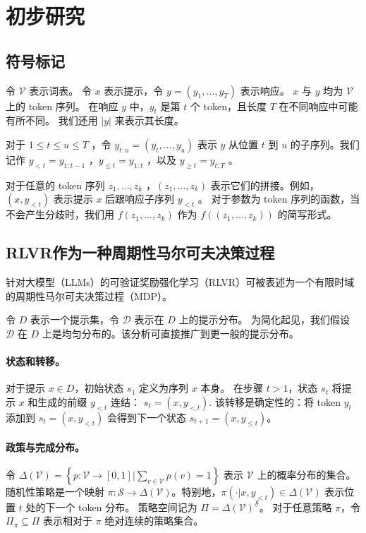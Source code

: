 \documentclass[11pt]{article}
\theoremstyle{definition}
\def\dr#1{\left\{#1\right\}}
\def\calD{\mathcal{D}}
\def\calS{\mathcal{S}}
\newcommand\tpi{\pi}
\newcommand\policyspace{\Pi}
\begin{document}
\FloatBarrier

\section{初步研究}\label{sec:prel1}

\subsection{符号标记}\label{sec:prel2}  
令 $\mathcal{V}$ 表示词表。  
令 $x$ 表示提示，令 $y=(y_1,\ldots,y_T)$ 表示响应。  
$x$ 与 $y$ 均为 $\mathcal{V}$ 上的 token 序列。  
在响应 $y$ 中，$y_t$ 是第 $t$ 个 token，且长度 $T$ 在不同响应中可能有所不同。  
我们还用 $|y|$ 来表示其长度。

对于 $1\leq t\leq u\leq T$ ，令 $y_{t:u}=(y_t,\ldots,y_u)$ 表示 $y$ 从位置 $t$ 到 $u$ 的子序列。我们记作 $y_{<t} = y_{1:t-1}$ ，$y_{\leq t} = y_{1:t}$ ，以及 $y_{\geq t} = y_{t:T}$ 。   

对于任意的 token 序列 $z_1,\ldots,z_k$ ，$(z_1,\ldots,z_k)$ 表示它们的拼接。例如，$(x,y_{<t})$ 表示提示 $x$ 后跟响应子序列 $y_{<t}$ 。 
对于参数为 token 序列的函数，当不会产生分歧时，我们用 $f(z_1,\ldots,z_k)$ 作为 $f((z_1,\ldots,z_k))$ 的简写形式。 

\subsection{RLVR作为一种周期性马尔可夫决策过程}
针对大模型（LLMs）的可验证奖励强化学习（RLVR）可被表述为一个有限时域的周期性马尔可夫决策过程（MDP）。 

令 $D$ 表示一个提示集，令 $\calD$ 表示在 $D$ 上的提示分布。  
为简化起见，我们假设 $\calD$ 在 $D$ 上是均匀分布的。该分析可直接推广到更一般的提示分布。

\paragraph{状态和转移。}
对于提示 $x\in D$，初始状态 $s_1$ 定义为序列 $x$ 本身。  
在步骤 $t>1$，状态 $s_t$ 将提示 $x$ 和生成的前缀 $y_{<t}$ 连结：  
$
    s_t = (x,y_{<t}).
$   
该转移是确定性的：将 token $y_t$ 添加到 $s_t=(x,y_{<t})$ 会得到下一个状态 $s_{t+1}=(x,y_{\leq t})$。  

\paragraph{政策与完成分布。}
令 $\Delta(\mathcal{V}) = \dr{p: \mathcal{V}\rightarrow[0,1]| \sum_{v\in\mathcal{V}}p(v)=1}$ 表示 $\mathcal{V}$ 上的概率分布的集合。  
随机性策略是一个映射 $\tpi:\calS \rightarrow \Delta(\mathcal{V})$。特别地，$\tpi(\cdot | x,y_{<t})\in\Delta(\mathcal{V})$ 表示位置 $t$ 处的下一个 token 分布。  
策略空间记为 $\policyspace = \Delta(\mathcal{V})^{\calS}$。  
对于任意策略 $\pi$，令 $\Pi_{\pi} \subseteq \Pi$ 表示相对于 $\pi$ 绝对连续的策略集合。
\end{document}
